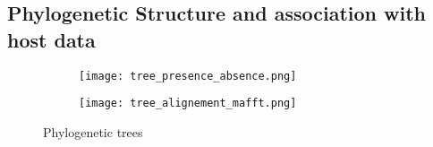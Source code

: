 \subsection*{Phylogenetic Structure and association with host data}
\graphicspath{{images/phylogeneticStructureHostData/}}






\begin{figure}[h]	%
    \centering
    \begin{subfigure}[b]{0.8\textwidth}
        \centering
        \texttt{[image: tree\_presence\_absence.png]}
        \caption{\scriptsize{}}
        \label{fig:tree_genes}
    \end{subfigure}
    \begin{subfigure}[b]{0.8\textwidth}
        \centering
        \texttt{[image: tree\_alignement\_mafft.png]}
        \caption{}
        \label{fig:tree_align}
    \end{subfigure}
       \caption{Phylogenetic trees}
       \label{fig:trees}
\end{figure}

